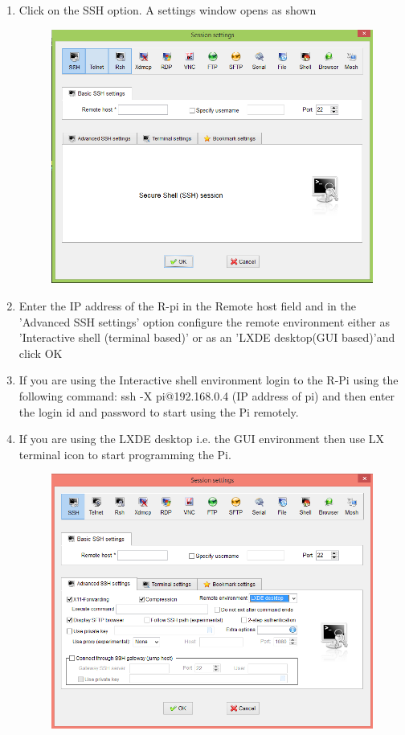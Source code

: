 \documentclass[11pt,a4paper]{article}
\begin{document}
\begin{enumerate}
\begin{figure}[h!]
			\centering
		\end{figure}
		\newpage
		\item Click on the SSH option. A settings window opens as shown
		\begin{figure}[h!]
			\includegraphics[scale=0.5]{M3.PNG}
			\centering
		\end{figure}
		\item Enter the IP address of the R-pi in the Remote host field and in the 'Advanced SSH settings' option configure the remote environment either as 'Interactive shell (terminal based)' or as an 'LXDE desktop(GUI based)'and click OK
		\item If you are using the Interactive shell environment login to the R-Pi using the following command: ssh -X pi@192.168.0.4 (IP address of pi) and then enter the login id and password to start using the Pi remotely.
		\item If you are using the LXDE desktop i.e. the GUI environment then use LX terminal icon to start programming the Pi.
		\begin{figure}[h]
			\includegraphics[scale=0.5]{M4.PNG}

\end{figure}
\end{enumerate}
\end{document}
